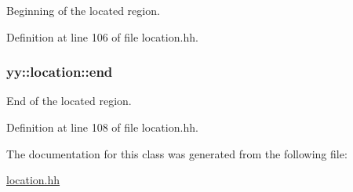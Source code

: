 Beginning of the located region. 



Definition at line 106 of file location.\-hh.

\hypertarget{classyy_1_1location_aa9be2a89fdb63da08167ebd4b819addd}{
\subsubsection[{end}]{ yy\-::location\-::end}}\label{classyy_1_1location_aa9be2a89fdb63da08167ebd4b819addd}


End of the located region. 



Definition at line 108 of file location.\-hh.



The documentation for this class was generated from the following file\-:\begin{DoxyCompactItemize}
\item 
\hyperlink{location_8hh}{location.\-hh}\end{DoxyCompactItemize}
